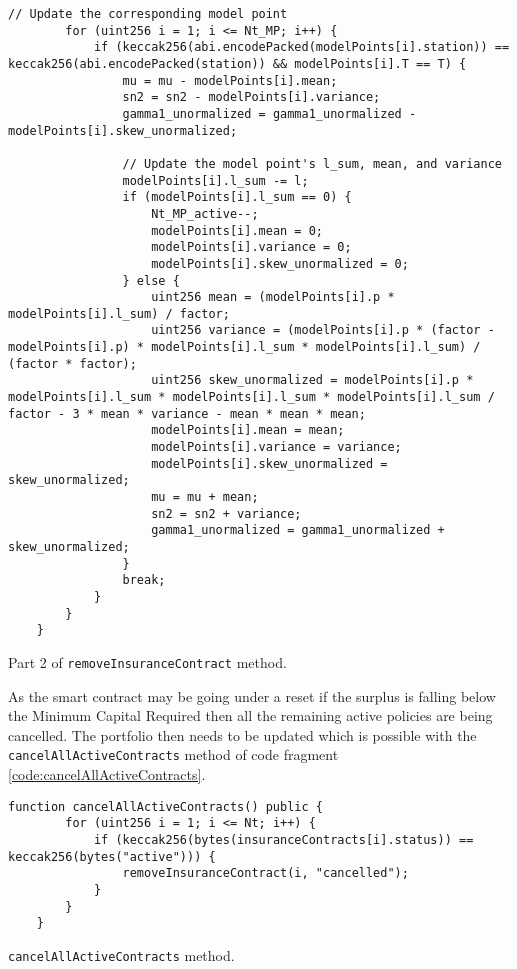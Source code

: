 \documentclass[10pt]{article}
\begin{document}
\begin{codefragment}[!h]
\begin{lstlisting}[language=Solidity]
        // Update the corresponding model point
        for (uint256 i = 1; i <= Nt_MP; i++) {
            if (keccak256(abi.encodePacked(modelPoints[i].station)) == keccak256(abi.encodePacked(station)) && modelPoints[i].T == T) {
                mu = mu - modelPoints[i].mean;
                sn2 = sn2 - modelPoints[i].variance;
                gamma1_unormalized = gamma1_unormalized - modelPoints[i].skew_unormalized;

                // Update the model point's l_sum, mean, and variance
                modelPoints[i].l_sum -= l;
                if (modelPoints[i].l_sum == 0) {
                    Nt_MP_active--;
                    modelPoints[i].mean = 0;
                    modelPoints[i].variance = 0;
                    modelPoints[i].skew_unormalized = 0;
                } else {
                    uint256 mean = (modelPoints[i].p * modelPoints[i].l_sum) / factor;
                    uint256 variance = (modelPoints[i].p * (factor - modelPoints[i].p) * modelPoints[i].l_sum * modelPoints[i].l_sum) / (factor * factor);
                    uint256 skew_unormalized = modelPoints[i].p * modelPoints[i].l_sum * modelPoints[i].l_sum * modelPoints[i].l_sum / factor - 3 * mean * variance - mean * mean * mean;
                    modelPoints[i].mean = mean;
                    modelPoints[i].variance = variance;
                    modelPoints[i].skew_unormalized = skew_unormalized;
                    mu = mu + mean;
                    sn2 = sn2 + variance;
                    gamma1_unormalized = gamma1_unormalized + skew_unormalized;
                }
                break;
            }
        }
    }
        \end{lstlisting}
    \caption{Part 2 of \texttt{removeInsuranceContract} method.}
    \label{code:removeInsuranceContract_2}
\end{codefragment}

\newpage

As the smart contract may be going under a reset if the surplus is falling below the Minimum Capital Required then all the remaining active policies are being cancelled. The portfolio then needs to be updated which is possible with the \texttt{cancelAllActiveContracts} method of code fragment \ref{code:cancelAllActiveContracts}.

\begin{codefragment}[!h]
\begin{lstlisting}[language=Solidity]
function cancelAllActiveContracts() public {
        for (uint256 i = 1; i <= Nt; i++) {
            if (keccak256(bytes(insuranceContracts[i].status)) == keccak256(bytes("active"))) {
                removeInsuranceContract(i, "cancelled");
            }
        }
    }
        \end{lstlisting}
    \caption{\texttt{cancelAllActiveContracts} method.}
    \label{code:cancelAllActiveContracts}
\end{codefragment}
\end{document}
